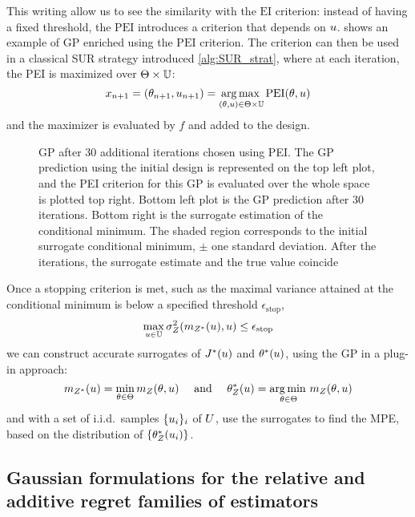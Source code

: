 \documentclass[../../Main_ManuscritThese.tex]{subfiles}
\newcommand\imgpath{/home/victor/acadwriting/Manuscrit/Text/Chapter4/img/}
\begin{document}
This writing allow us to see the similarity with the $\mathrm{EI}$ criterion: instead of having a fixed threshold, the $\mathrm{PEI}$ introduces a criterion that depends on $u$.  shows an example of GP enriched using the $\mathrm{PEI}$ criterion.
The criterion can then be used in a classical SUR strategy introduced \cref{alg:SUR_strat}, where at each iteration, the PEI is maximized over $\Theta \times \mathbb{U}$:
\begin{equation}
  \label{eq:PEI_criterion_SUR}
  x_{n+1}=(\theta_{n+1}, u_{n+1}) =\operatorname*{arg\,max \,}_{(\theta, u)\in \Theta \times \mathbb{U}} \mathrm{PEI}(\theta, u)
\end{equation}
and the maximizer is evaluated by $f$ and added to the design.
\begin{figure}[ht]
  \centering
  
  \caption[Illustration of enrichment using the PEI criterion]{\label{fig:example_PEI} GP after 30 additional iterations chosen using PEI. The GP prediction using the initial design is represented on the top left plot, and the PEI criterion for this GP is evaluated over the whole space is plotted top right. Bottom left plot is the GP prediction after 30 iterations. Bottom right is the surrogate estimation of the conditional minimum. The shaded region corresponds to the initial surrogate conditional minimum, $\pm$ one standard deviation. After the iterations, the surrogate estimate and the true value coincide}
\end{figure}
Once a stopping criterion is met, such as the maximal variance attained at the conditional minimum is below a specified threshold $\epsilon_{\mathrm{stop}}$, 
\begin{equation}
  \max_{u\in\mathbb{U}} \sigma^2_Z(m_{Z^*}(u), u) \leq \epsilon_{\mathrm{stop}}
\end{equation}
we can construct accurate surrogates of $J^*(u)$ and $\theta^*(u)$, using the GP in a plug-in approach:
\begin{equation}
 m_{Z^*}(u) = \min_{\theta\in\Theta} m_Z(\theta,u)  \quad \text{ and } \quad \theta_Z^*(u) =\operatorname*{arg\,min \,}_{\theta\in\Theta} m_Z(\theta, u)
\end{equation}
and with a set of i.i.d.\ samples $\{u_i\}_i$ of $U$, use the surrogates to find the MPE, based on the distribution of $\{\theta_Z^*(u_i)\}$.



\subsection{Gaussian formulations for the relative and additive regret families of estimators}
\label{ssec:gp_delta_alpha}
\end{document}
